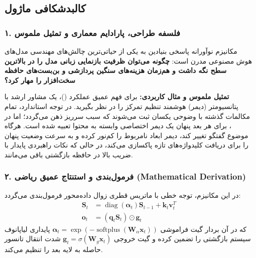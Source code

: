 \subsection{کالبدشکافی ماژول }

\subsubsection*{۱. فلسفه طراحی، پارادایم معماری و تمثیل ملموس}
مکانیزم نوآورانه  پاسخی بنیادین به یکی از حیاتی‌ترین چالش‌های مهندسی مدل‌های هوش مصنوعی مدرن است: \textbf{چگونه می‌توان ظرفیت بازنمایی زبانی مدل را در بالاترین سطح نگه داشت و هم‌زمان هزینه‌های سنگین پردازشی و بن‌بست‌های حافظه سخت‌افزار را مهار کرد؟}

\textbf{تمثیل ملموس و مثال کاربردی:}
برای فهم عمیق عملکرد  ()، یک مشاور ارشد با پتانسیومتر (دیمر) هوشمند تنظیم تمرکز را در نظر بگیرید. در توجه استاندارد، تمام مکالمات گذشته با وضوحی یکسان ثبت می‌شوند که سبب سرریز ذهن می‌گردد؛ اما در ، برای هر بعد پنهان یک دیمر اختصاصی وابسته به محتوا تعبیه شده است. هرگاه موضوع گفتگو تغییر کند، دیمر ابعاد نامربوط را کم‌نور کرده و به سرعت وضعیت پنهان را برای دریافت کلیدواژه‌های تازه پاکسازی می‌کند، در حالی که نکات راهبردی پایدار با ضریب بالا در حافظه بازگشتی باقی می‌مانند.

\subsubsection*{۲. فرمول‌بندی و استنتاج عمیق ریاضی (Mathematical Derivation)}
در این مکانیزم، توجه خطی با ماتریس قطری زوال داده‌محور فرمول‌بندی می‌گردد:
\begin{align}
\mathbf{S}_t &= \operatorname{diag}(\boldsymbol{\alpha}_t) \mathbf{S}_{t-1} + \mathbf{k}_t \mathbf{v}_t^T \\
\mathbf{o}_t &= (\mathbf{q}_t \mathbf{S}_t) \odot \mathbf{g}_t
\end{align}
که در آن بردار گیت فراموشی $\boldsymbol{\alpha}_t = \exp(-\operatorname{softplus}(\mathbf{W}_\alpha \mathbf{x}_t))$ پایداری لیاپانوف سیستم بازگشتی را تضمین کرده و گیت خروجی $\mathbf{g}_t = \sigma(\mathbf{W}_g \mathbf{x}_t)$ شدت انتقال تانسور حاصله به لایه بعد را تنظیم می‌کند.

